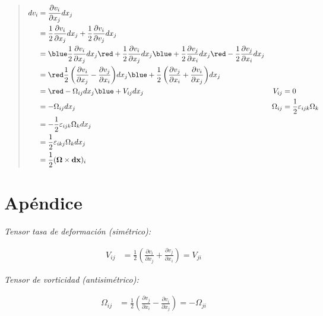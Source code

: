 \documentclass[a4paper,10pt,twoside,final,spanish]{article}
\begin{document}
\begin{enumerate}[a.]
\begin{quote}
\begin{align*}
dv_{i} &= \frac{\partial v_{i}}{\partial x_{j}}dx_{j} & \\
&= \frac{1}{2}\frac{\partial v_{i}}{\partial x_{j}}dx_{j}
+\frac{1}{2}\frac{\partial v_{i}}{\partial v_{j}}dx_{j} & \\
&= {\blue \frac{1}{2}\frac{\partial v_{i}}{\partial x_{j}}dx_{j}}
{\red +\frac{1}{2}\frac{\partial v_{i}}{\partial x_{j}}dx_{j}}
{\blue +\frac{1}{2}\frac{\partial v_{j}}{\partial x_{i}}dx_{j}}
{\red -\frac{1}{2}\frac{\partial v_{j}}{\partial x_{i}}dx_{j}} & \\
&= {\red \frac{1}{2}\left(\frac{\partial v_{i}}{\partial x_{j}}
-\frac{\partial v_{j}}{\partial x_{i}}\right)}dx_{j}
{\blue +\frac{1}{2}\left(\frac{\partial v_{j}}{\partial x_{i}}
+\frac{\partial v_{i}}{\partial x_{j}}\right)}dx_{j} & \\
&= {\red -\Omega_{ij}}dx_{j}{\blue +V_{ij}}dx_{j} & V_{ij} &= 0 \\
&= -\Omega_{ij}dx_{j} & \Omega_{ij} &= \frac{1}{2}\varepsilon_{ijk}\Omega_{k}\\
&= -\frac{1}{2}\varepsilon_{ijk}\Omega_{k}dx_{j} & \\
&= \frac{1}{2}\varepsilon_{ikj}\Omega_{k}dx_{j} & \\
&= \frac{1}{2}(\mathbf{\Omega}\times\mathbf{dx})_{i} & \\
\end{align*}
\end{quote}
\end{enumerate}

\section*{Apéndice}

\textit{Tensor tasa de deformación (simétrico):}

\begin{align*}
V_{ij} &= \frac{1}{2}\left(\frac{\partial v_{i}}{\partial x_{j}}
+ \frac{\partial v_{j}}{\partial x_{i}}\right)=V_{ji}
\end{align*}

\vspace{1em}

\textit{Tensor de vorticidad (antisimétrico):}

\begin{align*}
\Omega_{ij} &= \frac{1}{2}\left(\frac{\partial v_{j}}{\partial x_{i}}
- \frac{\partial v_{i}}{\partial x_{j}}\right)=-\Omega_{ji}
\end{align*}
\end{document}
